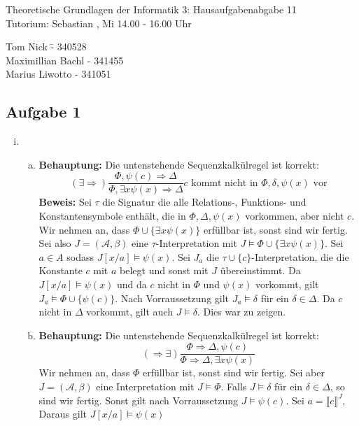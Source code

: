 \documentclass[a4paper,10pt]{article}
\begin{document}
\begin{center}
\Large{Theoretische Grundlagen der Informatik 3: Hausaufgabenabgabe 11} \\
\large{Tutorium: Sebastian , Mi 14.00 - 16.00 Uhr}
\end{center}
\begin{tabbing}
Tom Nick \hspace{2cm}\= - 340528\\
Maximillian Bachl \> - 341455 \\
Marius Liwotto\> -  341051
\end{tabbing}
\subsection*{Aufgabe 1}
\begin{enumerate}[(i)]
	\item
	\begin{enumerate}[a)]
	
		\item \textbf{Behauptung: } Die untenstehende Sequenzkalkülregel ist korrekt:
		\[ (\exists \Rightarrow) \frac{\Phi, \psi(c) \Rightarrow \Delta}{\Phi, \exists x \psi(x)\Rightarrow \Delta} c \text{ kommt nicht in $\Phi,\delta,\psi(x)$ vor}\]
		\textbf{Beweis:} 
		Sei $\tau$ die Signatur die alle Relations-, Funktions- und Konstantensymbole enthält, die in $\Phi, \Delta, \psi(x)$ vorkommen, aber nicht $c$.
		Wir nehmen an, dass $\Phi \cup \{ \exists x \psi(x)\}$ erfüllbar ist, sonst sind wir fertig. \\
		Sei also $J = (\mathcal{A}, \beta)$ eine $\tau$-Interpretation mit $J \vDash \Phi \cup \{\exists x\psi(x) \}$. 
		Sei $a \in A$ sodass $J[x/a] \vDash \psi(x)$. Sei $J_a$ die $\tau \cup \{c\}$-Interpretation, die die Konstante $c$ mit $a$ belegt und
		sonst mit $J$ übereinstimmt. Da $J[x/a] \vDash \psi(x)$ und da $c$ nicht in $\Phi$ und $\psi(x)$ vorkommt, gilt $J_a \vDash \Phi \cup \{\psi(c)\}$.
		Nach Vorraussetzung gilt $J_a \vDash \delta$ für ein $\delta \in \Delta$. Da $c$ nicht in $\Delta$ vorkommt, gilt auch $J \vDash \delta$. Dies war zu zeigen.
		\item \textbf{Behauptung: } Die untenstehende Sequenzkalkülregel ist korrekt:
		\[  ( \Rightarrow \exists ) \frac{\Phi \Rightarrow \Delta, \psi(c)}{\Phi\Rightarrow \Delta, \exists x \psi(x)} \]
		Wir nehmen an, dass $\Phi$ erfüllbar ist, sonst sind wir fertig. Sei aber $J = (\mathcal{A}, \beta)$ eine Interpretation mit $J \vDash \Phi$. 
		Falls $J \vDash \delta$ für ein $\delta \in \Delta$, so sind wir fertig. Sonst gilt nach Vorraussetzung $J \vDash \psi(c)$. Sei $a = \llbracket c \rrbracket^J$,
		Daraus gilt $J[x/a] \vDash \psi(x)$
	\end{enumerate}
\end{enumerate}
\end{document}
